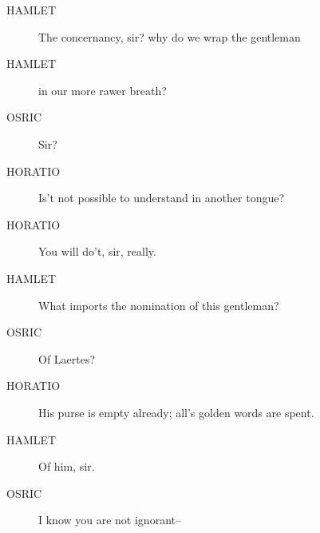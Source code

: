 \documentclass{article}
\begin{document}
\begin{description}
            
\item[HAMLET] The concernancy, sir? why do we wrap the gentleman
\item[HAMLET] in our more rawer breath?
\end{description}
          
\begin{description}
            
\item[OSRIC] Sir?
\end{description}
          
\begin{description}
            
\item[HORATIO] Is't not possible to understand in another tongue?
\item[HORATIO] You will do't, sir, really.
\end{description}
          
\begin{description}
            
\item[HAMLET] What imports the nomination of this gentleman?
\end{description}
          
\begin{description}
            
\item[OSRIC] Of Laertes?
\end{description}
          
\begin{description}
            
\item[HORATIO] His purse is empty already; all's golden words are spent.
\end{description}
          
\begin{description}
            
\item[HAMLET] Of him, sir.
\end{description}
          
\begin{description}
            
\item[OSRIC] I know you are not ignorant--
\end{description}
          
\end{document}
